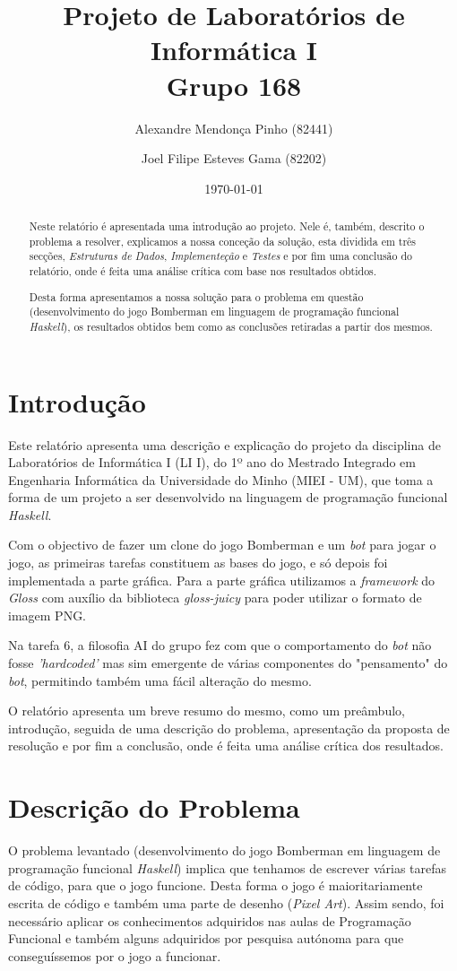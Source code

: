 \documentclass[a4paper]{report}
\title{Projeto de Laboratórios de Informática I\\Grupo 168}
\author{Alexandre Mendonça Pinho (82441) \and Joel Filipe Esteves Gama (82202)}
\date{\today}
\begin{document}
\maketitle
\begin{abstract}
Neste relatório é apresentada uma introdução ao projeto. Nele é, também, descrito o problema a resolver, explicamos a nossa conceção da solução, esta dividida em três secções, \emph{Estruturas de Dados}, \emph{Implementeção} e \emph{Testes} e por fim uma conclusão do relatório, onde é feita uma análise crítica com base nos resultados obtidos.

Desta forma apresentamos a nossa solução para o problema em questão (desenvolvimento do jogo Bomberman em linguagem de programação funcional \textit{Haskell}), os resultados obtidos bem como as conclusões retiradas a partir dos mesmos.
\end{abstract}
\tableofcontents
\chapter{Introdução}
\label{sec:intro}
Este relatório apresenta uma descrição e explicação do projeto da disciplina de Laboratórios de Informática I (LI I),
do 1º ano do Mestrado Integrado em Engenharia Informática da Universidade do Minho (MIEI - UM),
que toma a forma de um projeto a ser desenvolvido na linguagem de programação funcional \textit{Haskell}.

Com o objectivo de fazer um clone do jogo Bomberman e um \textit{bot} para jogar o jogo, as primeiras tarefas constituem as bases do jogo, e só depois foi implementada a parte gráfica. Para a parte gráfica utilizamos a \textit{framework} do \textit{Gloss} com auxílio da biblioteca \textit{gloss-juicy} para poder utilizar o formato de imagem PNG.

Na tarefa 6, a filosofia AI do grupo fez com que o comportamento do \textit{bot} não fosse \textit{'hardcoded'} mas sim emergente de várias componentes do "pensamento" do \textit{bot}, permitindo também uma fácil alteração do mesmo.

O relatório apresenta um breve resumo do mesmo, como um preâmbulo, introdução, seguida de uma descrição do problema, apresentação da proposta de resolução e por fim a conclusão, onde é feita uma análise crítica dos resultados.
\chapter{Descrição do Problema}
\label{sec:problema}
O problema levantado (desenvolvimento do jogo Bomberman em linguagem de programação funcional \textit{Haskell}) implica que tenhamos de escrever várias tarefas de código, para que o jogo funcione. Desta forma o jogo é maioritariamente escrita de código e também uma parte de desenho (\textit{Pixel Art}). Assim sendo, foi necessário aplicar os conhecimentos adquiridos nas aulas de Programação Funcional e também alguns adquiridos por pesquisa autónoma para que conseguíssemos por o jogo a funcionar.
\end{document}
